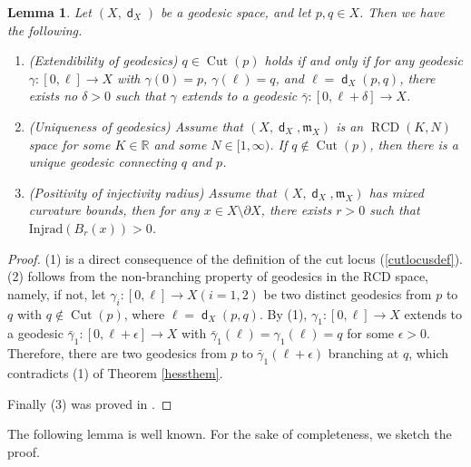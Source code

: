\documentclass[11pt,reqno]{amsart}
\newtheorem{lemma}[theorem]{Lemma}
\theoremstyle{definition}
\numberwithin{equation}{section}
\newcommand{\fm}{\mathfrak{m}}
\DeclareMathOperator{\Cut}{Cut}
\DeclareMathOperator{\dist}{\mathsf{d}}
\DeclareMathOperator{\RCD}{RCD}
\begin{document}
\begin{lemma}\label{injeclemma}
Let $(X, \dist_X)$ be a geodesic space, and let $p , q \in X$. Then we have the following.
\begin{enumerate}
    \item{(Extendibility of geodesics)} $q \in \Cut(p)$ holds if and only if 
    for any geodesic $\gamma: [0,\ell] \to X$  with $\gamma(0) = p$,  $\gamma(\ell) = q$, and $\ell = \dist_X(p,q)$, there exists no $\delta > 0$ such that $\gamma$ extends to a geodesic $\bar{\gamma}:[0,\ell + \delta] \to X$.
    \item{(Uniqueness of geodesics)} Assume that $(X, \dist_X, \fm_X)$ is an $\RCD(K,N)$ space for some $K \in \mathbb{R}$ and some $N \in [1, \infty)$. If $q \not\in \Cut(p)$, then there is a unique geodesic connecting $q$ and $p$.
    \item{(Positivity of injectivity radius)} Assume that $(X, \dist_X, \fm_X)$ has mixed curvature bounds, then for any $x \in X \setminus \partial X$, there exists $r>0$ such that $\mathrm{Injrad}(B_r(x))>0$.
\end{enumerate}
\end{lemma}
\begin{proof}
(1) is a direct consequence of the definition of the cut locus (\ref{cutlocusdef}). (2) follows from the non-branching property of geodesics in the RCD space, namely, if not, let $\gamma_i:[0, \ell] \to X(i=1,2)$ be two distinct geodesics 
from $p$ to $q$ with $q\not\in \Cut(p)$, where $\ell=\dist_X(p,q)$. By (1), $\gamma_1:[0,\ell]\to X$ extends to a geodesic $\bar{\gamma}_1:[0,\ell+\epsilon]\to X$ with $\bar{\gamma}_1 (\ell) =  \gamma_1 (\ell)  = q$ for some $\epsilon>0$. 
Therefore, there are two geodesics from $p$ to $\bar \gamma_1(\ell+\epsilon)$ branching at $q$, which contradicts 
 (1) of Theorem \ref{hessthem}.

 Finally (3) was proved in \cite[Theorem 3.19]{KKK}.
\end{proof}
    
     
The following lemma is well known. For the sake of completeness, we sketch the proof. 
\end{document}
